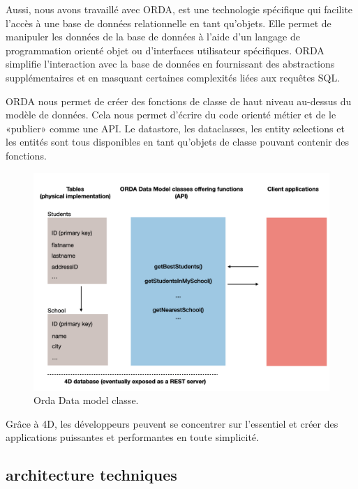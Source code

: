 Aussi, nous avons travaillé avec ORDA, est une technologie spécifique qui facilite
l’accès à une base de données relationnelle en tant qu’objets. Elle permet de manipuler les
données de la base de données à l’aide d’un langage de programmation orienté objet ou
d’interfaces utilisateur spécifiques. ORDA simplifie l’interaction avec la base de données
en fournissant des abstractions supplémentaires et en masquant certaines complexités liées
aux requêtes SQL.

ORDA nous permet de créer des fonctions de classe de haut niveau au-dessus du modèle de données. Cela nous permet d'écrire du code orienté métier et de le «publier» comme une API. Le datastore, les dataclasses, les entity selections et les entités sont tous disponibles en tant qu'objets de classe pouvant contenir des fonctions.

\begin{figure}[H]
    \centering
    \includegraphics[width=15cm]{Figures/orda.png}
    \caption{Orda Data model classe.}
\end{figure}

Grâce à 4D, les développeurs peuvent se concentrer sur l’essentiel et créer des applications puissantes et performantes en toute simplicité.

\subsection{architecture techniques}

